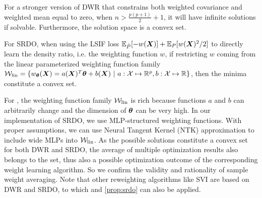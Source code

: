 \begin{proposition}
\label{prop:dwr}
For a stronger version of DWR that constrains both weighted covariance and weighted mean equal to zero, when $n>\frac{p(p+1)}{2}+1$, it will have infinite solutions if solvable. Furthermore, the solution space is a convex set. 
\end{proposition}

\begin{proposition}
\label{prop:srdo}
For SRDO, when using the LSIF loss $\mathbb{E}_{\tilde{P}}[-w(\boldsymbol{X})]+\mathbb{E}_{P}[w(\boldsymbol{X})^2/2]$ to directly learn the density ratio, i.e. the weighting function $w$, if restricting $w$ coming from the linear parameterized weighting function family $\mathcal{W}_{\rm lin}=\{w_{\boldtheta}(\boldx)=a(\boldx)^T \boldtheta+b(\boldx)\ | \ a:\mathcal{X}\mapsto \mathbb{R}^p,b:\mathcal{X}\mapsto \mathbb{R}\}$, then the minima constitute a convex set. 
\end{proposition}

For , the weighting function family $\mathcal{W}_{\rm lin}$ is rich because functions $a$ and $b$ can arbitrarily change and the dimension of $\boldsymbol{\theta}$ can be very high. In our implementation of SRDO, we use MLP-structured weighting functions. With proper assumptions, we can use Neural Tangent Kernel (NTK) approximation \citep{lee2019wide} to include wide MLPs into $\mathcal{W}_{\rm lin}$. 
As the possible solutions constitute a convex set for both DWR and SRDO, the average of multiple optimization results also belongs to the set, thus also a possible optimization outcome of the corresponding weight learning algorithm. So we confirm the validity and rationality of sample weight averaging. Note that other reweighting algorithms like SVI are based on DWR and SRDO, to which  and \ref{prop:srdo} can also be applied. 

